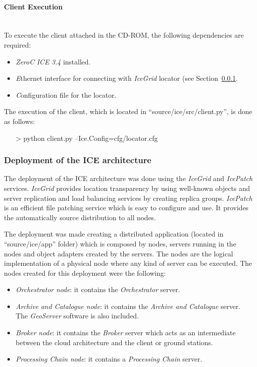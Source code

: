 \paragraph{Client Execution}~\\

To execute the client attached in the CD-ROM, the following dependencies
are required:
\begin{itemize}
\item \emph{ZeroC ICE 3.4} installed.
\item \emph Ethernet interface for connecting with \emph{IceGrid} locator (see
  Section~\ref{subsub:deployment}.
\item \emph Configuration file for the locator.
\end{itemize}

The execution of the client, which is located in ``source/ice/src/client.py'',
is done as follows:
\begin{itemize}
\item[>] python client.py --Ice.Config=cfg/locator.cfg
\end{itemize}


\subsubsection{Deployment of the ICE architecture}
\label{subsub:deployment}

The deployment of the ICE architecture was done using the \emph{IceGrid}
and \emph{IcePatch} services. 
\emph{IceGrid} provides location transparency by using well-known objects and server replication and load
balancing services by creating replica groups. \emph{IcePatch} is an
efficient file patching service which is easy to configure and use. It provides the
automatically source distribution to all nodes.

The deployment was made creating a distributed application (located in
``source/ice/app'' folder) which is composed by
nodes, servers running in the nodes and object adapters created by the servers. 
The nodes are the logical implementation of a physical node where any kind of
server can be executed. The nodes created for this deployment were the
following:

\begin{itemize}
\item \emph{Orchestrator node}: it contains the \emph{Orchestrator} server.
\item \emph{Archive and Catalogue node}: it contains the \emph{Archive and Catalogue}
  server. The \emph{GeoServer} software is also included.
\item \emph{Broker node}: it contains the \emph{Broker} server which acts as an
  intermediate between the cloud architecture and the client or ground stations.
\item \emph{Processing Chain node}: it contains a \emph{Processing Chain} server. 
\end{itemize}


